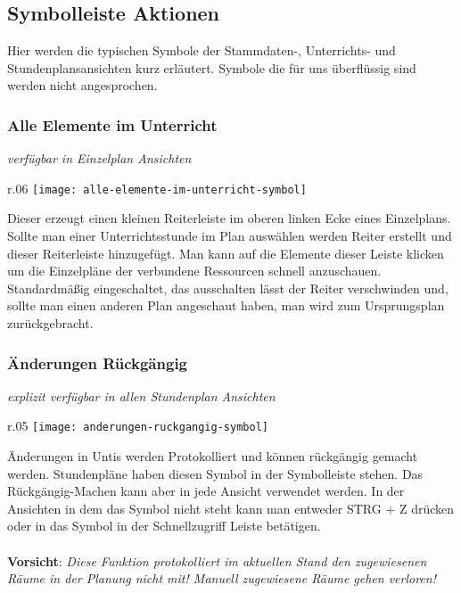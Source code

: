 \subsection{Symbolleiste Aktionen}

Hier werden die typischen Symbole der Stammdaten-, Unterrichts- und Stundenplansansichten kurz erläutert. Symbole die für uns überflüssig sind werden nicht angesprochen.\\

\subsubsection{Alle Elemente im Unterricht}
{\small\textit{verfügbar in Einzelplan Ansichten\\}\par}

\begin{wrapfigure}{r}{.06\textwidth}
	\vspace{-50pt}
	\texttt{[image: alle-elemente-im-unterricht-symbol]}
	\vspace{-35pt}
\end{wrapfigure}

\noindent
Dieser erzeugt einen kleinen Reiterleiste im oberen linken Ecke eines Einzelplans. Sollte man einer Unterrichtsstunde im Plan auswählen werden Reiter erstellt und dieser Reiterleiste hinzugefügt. Man kann auf die Elemente dieser Leiste klicken um die Einzelpläne der verbundene Ressourcen schnell anzuschauen. Standardmäßig eingeschaltet, das ausschalten lässt der Reiter verschwinden und, sollte man einen anderen Plan angeschaut haben, man wird zum Ursprungsplan zurückgebracht.\\

\subsubsection{Änderungen Rückgängig}
{\small\textit{explizit verfügbar in allen Stundenplan Ansichten\\}\par}

\begin{wrapfigure}{r}{.05\textwidth}
	\vspace{-50pt}
	\texttt{[image: anderungen-ruckgangig-symbol]}
	\vspace{-35pt}
\end{wrapfigure}

\noindent
Änderungen in Untis werden Protokolliert und können rückgängig gemacht werden. Stundenpläne haben diesen Symbol in der Symbolleiste stehen. Das Rückgängig-Machen kann aber in jede Ansicht verwendet werden. In der Ansichten in dem das Symbol nicht steht kann man entweder STRG + Z drücken oder in das Symbol in der Schnellzugriff Leiste betätigen.\\
\\
\textbf{Vorsicht}: \textit{Diese Funktion protokolliert im aktuellen Stand den zugewiesenen Räume in der Planung nicht mit! Manuell zugewiesene Räume gehen verloren!}\\

